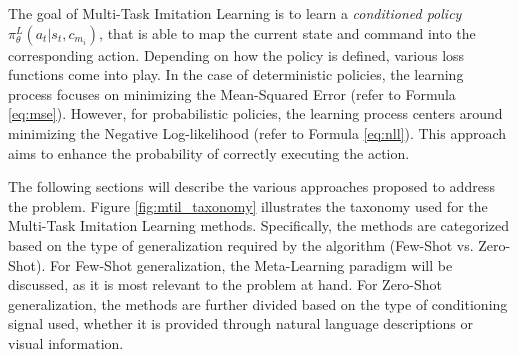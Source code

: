 The goal of Multi-Task Imitation Learning is to learn a \textit{conditioned policy} $\pi^{L}_{\theta}(a_{t}|s_{t}, c_{m_{i}})$, that is able to map the current state and command into the corresponding action.
Depending on how the policy is defined, various loss functions come into play. In the case of deterministic policies, the learning process focuses on minimizing the Mean-Squared Error (refer to Formula \ref{eq:mse}). However, for probabilistic policies, the learning process centers around minimizing the Negative Log-likelihood (refer to Formula \ref{eq:nll}). This approach aims to enhance the probability of correctly executing the action.

The following sections will describe the various approaches proposed to address the problem. Figure \ref{fig:mtil_taxonomy} illustrates the taxonomy used for the Multi-Task Imitation Learning methods. Specifically, the methods are categorized based on the type of generalization required by the algorithm (Few-Shot vs. Zero-Shot). For Few-Shot generalization, the Meta-Learning paradigm will be discussed, as it is most relevant to the problem at hand. For Zero-Shot generalization, the methods are further divided based on the type of conditioning signal used, whether it is provided through natural language descriptions or visual information.



